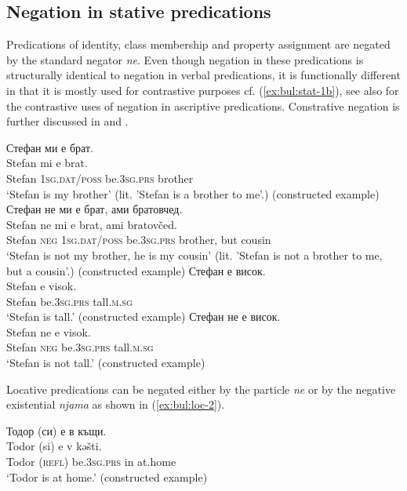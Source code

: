 \documentclass[output=paper,colorlinks=true, citecolor=brown]{langscibook}
\begin{document}
\subsection{Negation in stative predications} \label{sect:stative}
Predications of identity, class membership and property assignment are negated by the standard negator \textit{ne}. Even though negation in these predications is structurally identical to negation in verbal predications, it is functionally different in that it is mostly used for contrastive purposes cf. (\ref{ex:bul:stat-1b}), see also \citet{Mettouchi2006} for the contrastive uses of negation in ascriptive predications. Constrative negation is further discussed in  and .

\ea  \label{ex:bul:stat-1}
  \ea Стефан ми е брат.\label{ex:bul:stat-1a}\\ 
  	\gll Stefan mi e brat.\\
        Stefan \textsc{1sg.dat/poss} be.\textsc{3sg.prs} brother\\
    \glt `Stefan is my brother' (lit. 'Stefan is a brother to me'.) (constructed example)
  \ex Стефан не ми е брат, ами братовчед.\label{ex:bul:stat-1b}\\ 
  	\gll Stefan ne mi e brat, ami bratovčed.\\
        Stefan \textsc{neg} \textsc{1sg.dat/poss} be.\textsc{3sg.prs} brother, but cousin\\
    \glt `Stefan is not my brother, he is my cousin' (lit. 'Stefan is not a brother to me, but a cousin'.) (constructed example)
  \ex Стефан е висок.\label{ex:bul:stat-1c}\\ 
    \gll Stefan e visok.\\
         Stefan be.\textsc{3sg.prs} tall.\textsc{m.sg}\\
    \glt `Stefan is tall.' (constructed example)
  \ex Стефан не е висок.\label{ex:bul:stat-1d}\\ 
	\gll Stefan ne e visok.\\
        Stefan \textsc{neg} be.\textsc{3sg.prs} tall.\textsc{m.sg}\\
    \glt `Stefan is not tall.' (constructed example)
  \z 
\z

Locative predications can be negated either by the particle \textit{ne} or by the negative existential \textit{njama} as shown in (\ref{ex:bul:loc-2}).

\ea  \label{ex:bul:loc-2}
  \ea Тодор (си) е в къщи.\label{ex:bul:loc-2a}\\ 
  	\gll Todor (si) e v kəšti.\\
     Todor (\textsc{refl}) be.\textsc{3sg.prs} in at.home\\
\glt `Todor is at home.' (constructed example)
\end{document}
